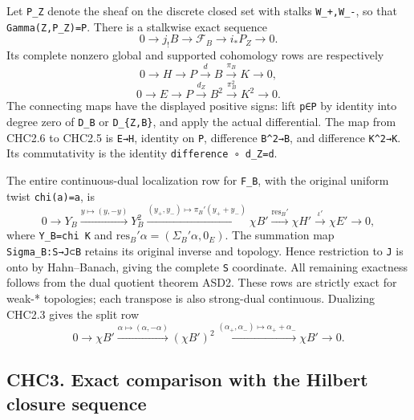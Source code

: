 Let \texttt{P\_Z} denote the sheaf on the discrete closed set with
stalks \texttt{W\_+,W\_-}, so that \texttt{Gamma(Z,P\_Z)=P}. There is a
stalkwise exact sequence \[
0\to j_!B\to\mathcal F_B\to i_*P_Z\to0.
\tag{CHC2.4}
\] Its complete nonzero global and supported cohomology rows are
respectively \[
0\to H\to P\xrightarrow d B\xrightarrow{\pi_B}K\to0,
\tag{CHC2.5}
\] \[
0\to E\to P\xrightarrow{d_Z}B^2
\xrightarrow{\pi_B^2}K^2\to0.
\tag{CHC2.6}
\] The connecting maps have the displayed positive signs: lift
\texttt{p∈P} by identity into degree zero of \texttt{D\_B} or
\texttt{D\_\{Z,B\}}, and apply the actual differential. The map from
CHC2.6 to CHC2.5 is \texttt{E→H}, identity on \texttt{P}, difference
\texttt{B\^{}2→B}, and difference \texttt{K\^{}2→K}. Its commutativity
is the identity \texttt{difference\ ∘\ d\_Z=d}.

The entire continuous-dual localization row for \texttt{F\_B}, with the
original uniform twist \texttt{chi(a)=a}, is \[
0\to Y_B\xrightarrow{y\mapsto(y,-y)}Y_B^2
\xrightarrow{(y_+,y_-)\mapsto\pi_B'(y_++y_-)}\chi B'
\xrightarrow{\mathrm{res}_B'}\chi H'
\xrightarrow{\iota'}\chi E'\to0,
\tag{CHC2.7}
\] where \texttt{Y\_B=chi\ K\textquotesingle{}} and
\(\mathrm{res}_B'\alpha=(\Sigma_B'\alpha,0_E)\). The summation map
\texttt{Sigma\_B:S→J⊂B} retains its original inverse and topology. Hence
restriction to \texttt{J} is onto by Hahn--Banach, giving the complete
\texttt{S\textquotesingle{}} coordinate. All remaining exactness follows
from the dual quotient theorem ASD2. These rows are strictly exact for
weak-* topologies; each transpose is also strong-dual continuous.
Dualizing CHC2.3 gives the split row \[
0\to\chi B'\xrightarrow{\alpha\mapsto(\alpha,-\alpha)}
(\chi B')^2\xrightarrow{(\alpha_+,\alpha_-)\mapsto\alpha_++\alpha_-}
\chi B'\to0.
\tag{CHC2.8}
\]

\subsection{CHC3. Exact comparison with the Hilbert closure
sequence}\label{chc3.-exact-comparison-with-the-hilbert-closure-sequence}

